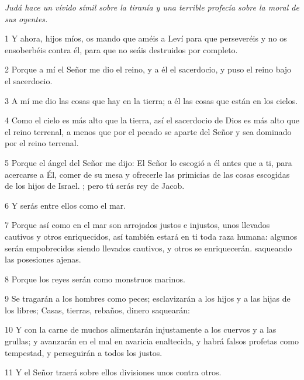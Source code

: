 \par \textit{Judá hace un vívido símil sobre la tiranía y una terrible profecía sobre la moral de sus oyentes.}

\par 1 Y ahora, hijos míos, os mando que améis a Leví para que perseveréis y no os ensoberbéis contra él, para que no seáis destruidos por completo.

\par 2 Porque a mí el Señor me dio el reino, y a él el sacerdocio, y puso el reino bajo el sacerdocio.

\par 3 A mí me dio las cosas que hay en la tierra; a él las cosas que están en los cielos.

\par 4 Como el cielo es más alto que la tierra, así el sacerdocio de Dios es más alto que el reino terrenal, a menos que por el pecado se aparte del Señor y sea dominado por el reino terrenal.

\par 5 Porque el ángel del Señor me dijo: El Señor lo escogió a él antes que a ti, para acercarse a Él, comer de su mesa y ofrecerle las primicias de las cosas escogidas de los hijos de Israel. ; pero tú serás rey de Jacob.

\par 6 Y serás entre ellos como el mar.

\par 7 Porque así como en el mar son arrojados justos e injustos, unos llevados cautivos y otros enriquecidos, así también estará en ti toda raza humana: algunos serán empobrecidos siendo llevados cautivos, y otros se enriquecerán. saqueando las posesiones ajenas.

\par 8 Porque los reyes serán como monstruos marinos.

\par 9 Se tragarán a los hombres como peces; esclavizarán a los hijos y a las hijas de los libres; Casas, tierras, rebaños, dinero saquearán:

\par 10 Y con la carne de muchos alimentarán injustamente a los cuervos y a las grullas; y avanzarán en el mal en avaricia enaltecida, y habrá falsos profetas como tempestad, y perseguirán a todos los justos.

\par 11 Y el Señor traerá sobre ellos divisiones unos contra otros.

